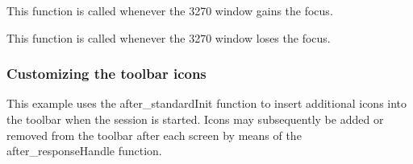 \documentclass[letterpaper,10pt,english]{sphinxmanual}
\begin{document}
\begin{sphinxVerbatim}[commandchars=\\\{\}]
\end{sphinxVerbatim}

This function is called whenever the 3270 window gains the focus.

\begin{sphinxVerbatim}[commandchars=\\\{\}]
\end{sphinxVerbatim}

This function is called whenever the 3270 window loses the focus.


\subsubsection{Customizing the toolbar icons}
\label{\detokenize{User_Guide:customizing-the-toolbar-icons}}
This example uses the after\_standardInit function to insert additional icons into the toolbar when the session is started. Icons may subsequently be added or removed from the toolbar after each screen by means of the after\_responseHandle function.
\end{document}
